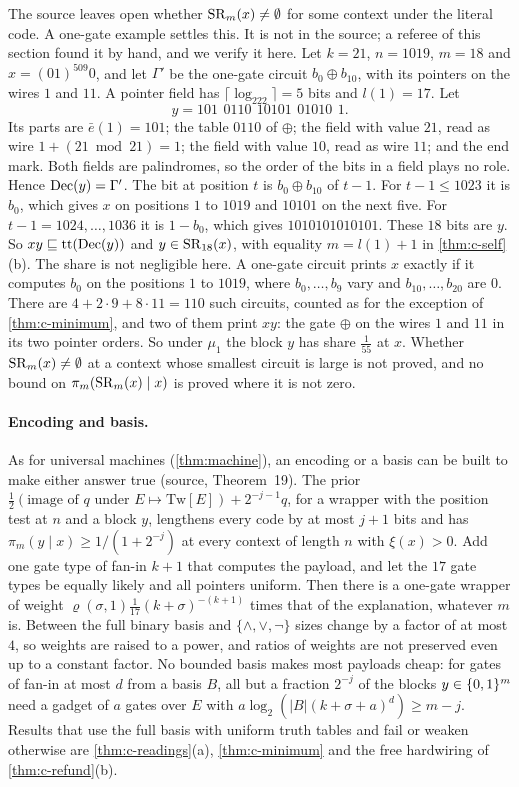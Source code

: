 The source leaves open whether $\mathrm{SR}_m(x)\ne\emptyset$ for some context under the literal code. A one-gate
example settles this. It is not in the source; a referee of this section found it by hand, and we verify it
here. Let $k=21$, $n=1019$, $m=18$ and $x=(01)^{509}0$, and let $\Gamma'$ be the one-gate circuit
$b_0\oplus b_{10}$, with its pointers on the wires $1$ and $11$. A pointer field has $\lceil\log_222\rceil=5$
bits and $l(1)=17$. Let
\[
y=101\ \,0110\ \,10101\ \,01010\ \,1 .
\]
Its parts are $\bar e(1)=101$; the table $0110$ of $\oplus$; the field with value $21$, read as wire
$1+(21\bmod21)=1$; the field with value $10$, read as wire $11$; and the end mark. Both fields are
palindromes, so the order of the bits in a field plays no role. Hence $\mathrm{Dec}(y)=\Gamma'$. The bit at position
$t$ is $b_0\oplus b_{10}$ of $t-1$. For $t-1\le1023$ it is $b_0$, which gives $x$ on positions $1$ to $1019$
and $10101$ on the next five. For $t-1=1024,\dots,1036$ it is $1-b_0$, which gives $1010101010101$. These $18$
bits are $y$. So $xy\sqsubseteq\mathrm{tt}(\mathrm{Dec}(y))$ and $y\in\mathrm{SR}_{18}(x)$, with equality $m=l(1)+1$ in
\cref{thm:c-self}(b). The share is not negligible here. A one-gate circuit prints $x$ exactly if it computes
$b_0$ on the positions $1$ to $1019$, where $b_0,\dots,b_9$ vary and $b_{10},\dots,b_{20}$ are $0$. There are
$4+2\cdot9+8\cdot11=110$ such circuits, counted as for the exception of \cref{thm:c-minimum}, and two of them
print $xy$: the gate $\oplus$ on the wires $1$ and $11$ in its two pointer orders. So under $\mu_1$ the block
$y$ has share $\frac1{55}$ at $x$. Whether $\mathrm{SR}_m(x)\ne\emptyset$ at a context whose smallest circuit is large
is not proved, and no bound on $\pi_m(\mathrm{SR}_m(x)\mid x)$ is proved where it is not zero.

\paragraph{Encoding and basis.} As for universal machines (\cref{thm:machine}), an encoding or a basis can be
built to make either answer true (source, Theorem~19). The prior
$\frac12(\text{image of }q\text{ under } E\mapsto\mathrm{Tw}[E])+2^{-j-1}q$, for a wrapper with the position
test at $n$ and a block $y$, lengthens every code by at most $j+1$ bits and has
$\pi_m(y\mid x)\ge1/(1+2^{-j})$ at every context of length $n$ with $\xi(x)>0$. Add one gate type of fan-in
$k+1$ that computes the payload, and let the $17$ gate types be equally likely and all pointers uniform. Then
there is a one-gate wrapper of weight $\varrho(\sigma,1)\frac1{17}(k+\sigma)^{-(k+1)}$ times that of the
explanation, whatever $m$ is. Between the full binary basis and $\{\wedge,\vee,\neg\}$ sizes change by a
factor of at most $4$, so weights are raised to a power, and ratios of weights are not preserved even up to a
constant factor. No bounded basis makes most payloads cheap: for gates of fan-in at most $d$ from a basis $B$,
all but a fraction $2^{-j}$ of the blocks $y\in\{0,1\}^m$ need a gadget of $a$ gates over $E$ with
$a\log_2(|B|(k+\sigma+a)^d)\ge m-j$. Results that use the full basis with uniform truth tables and fail or
weaken otherwise are \cref{thm:c-readings}(a), \cref{thm:c-minimum} and the free hardwiring of
\cref{thm:c-refund}(b).

